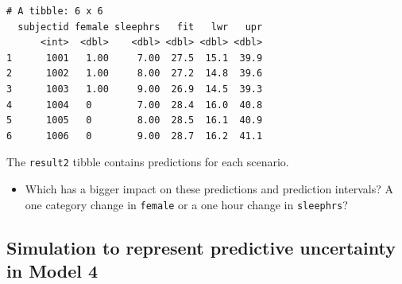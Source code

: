 \documentclass[]{book}
\newenvironment{Shaded}{\begin{snugshade}}{\end{snugshade}}
\newcommand{\KeywordTok}[1]{\textcolor[rgb]{0.13,0.29,0.53}{\textbf{#1}}}
\newcommand{\DataTypeTok}[1]{\textcolor[rgb]{0.13,0.29,0.53}{#1}}
\newcommand{\DecValTok}[1]{\textcolor[rgb]{0.00,0.00,0.81}{#1}}
\newcommand{\FloatTok}[1]{\textcolor[rgb]{0.00,0.00,0.81}{#1}}
\newcommand{\StringTok}[1]{\textcolor[rgb]{0.31,0.60,0.02}{#1}}
\newcommand{\OperatorTok}[1]{\textcolor[rgb]{0.81,0.36,0.00}{\textbf{#1}}}
\newcommand{\NormalTok}[1]{#1}
\providecommand{\tightlist}{%
  \setlength{\itemsep}{0pt}\setlength{\parskip}{0pt}}
\theoremstyle{definition}
\theoremstyle{definition}
\theoremstyle{definition}
\theoremstyle{remark}
\begin{document}
\begin{Shaded}
\end{Shaded}

\begin{verbatim}
# A tibble: 6 x 6
  subjectid female sleephrs   fit   lwr   upr
      <int>  <dbl>    <dbl> <dbl> <dbl> <dbl>
1      1001   1.00     7.00  27.5  15.1  39.9
2      1002   1.00     8.00  27.2  14.8  39.6
3      1003   1.00     9.00  26.9  14.5  39.3
4      1004   0        7.00  28.4  16.0  40.8
5      1005   0        8.00  28.5  16.1  40.9
6      1006   0        9.00  28.7  16.2  41.1
\end{verbatim}

The \texttt{result2} tibble contains predictions for each scenario.

\begin{itemize}
\tightlist
\item
  Which has a bigger impact on these predictions and prediction
  intervals? A one category change in \texttt{female} or a one hour
  change in \texttt{sleephrs}?
\end{itemize}

\subsection{Simulation to represent predictive uncertainty in Model
4}\label{simulation-to-represent-predictive-uncertainty-in-model-4}
\end{document}
